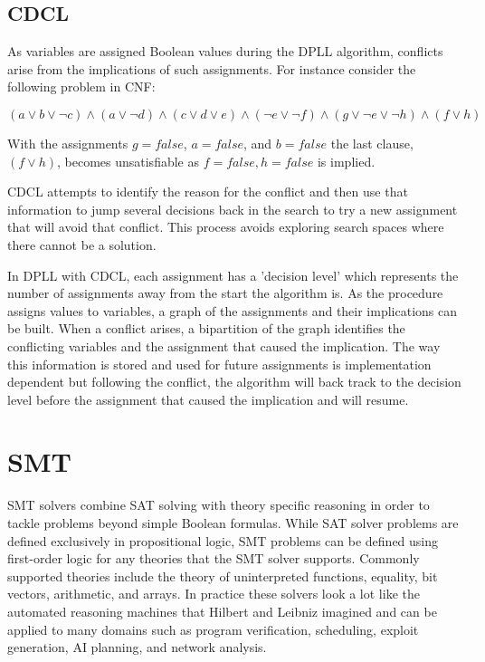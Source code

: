 \documentclass[]{final_report}
\begin{document}
\subsection{CDCL}
As variables are assigned Boolean values during the DPLL algorithm, conflicts arise from the implications of such assignments. For instance consider the following problem in CNF:

$(a \lor b \lor \lnot c) \land (a \lor \lnot d) \land (c \lor d \lor e) \land (\lnot e \lor \lnot f ) \land (g \lor \lnot e \lor \lnot h) \land (f \lor h)$

With the assignments $g = \mathit{false}$, $a = \mathit{false}$, and $b = \mathit{false}$ the last clause, $ (f \lor h) $,  becomes unsatisfiable as $ f = \mathit{false}, h = \mathit{false}$ is implied.

CDCL attempts to identify the reason for the conflict and then use that information to jump several decisions back in the search to try a new assignment that will avoid that conflict. This process avoids exploring search spaces where there cannot be a solution. 

In DPLL with CDCL, each assignment has a 'decision level' which represents the number of assignments away from the start the algorithm is. As the procedure assigns values to variables, a graph of the assignments and their implications can be built. When a conflict arises, a bipartition of the graph identifies the conflicting variables and the assignment that caused the implication. The way this information is stored and used for future assignments is implementation dependent but following the conflict, the algorithm will back track to the decision level before the assignment that caused the implication and will resume.

\section{SMT}

SMT solvers combine SAT solving with theory specific reasoning in order to tackle problems beyond simple Boolean formulas. While SAT solver problems are defined exclusively in propositional logic, SMT problems can be defined using first-order logic for any theories that the SMT solver supports. Commonly supported theories include the theory of uninterpreted functions, equality, bit vectors,  arithmetic, and arrays. In practice these solvers look a lot like the automated reasoning machines that Hilbert and Leibniz imagined and can be applied to many domains such as program verification, scheduling, exploit generation, AI planning, and network analysis.
\end{document}
